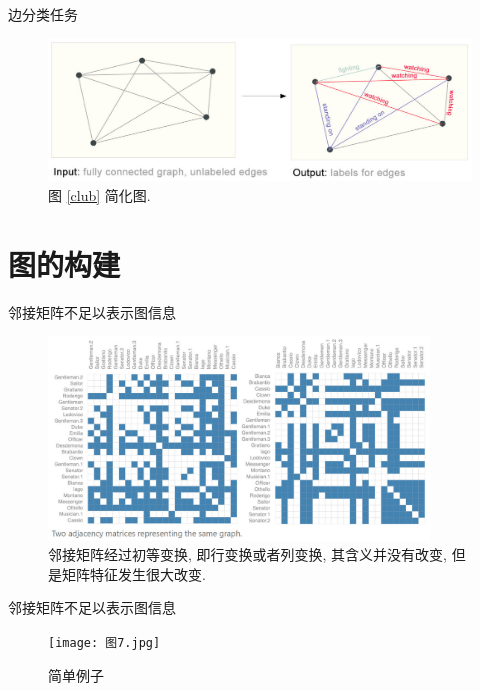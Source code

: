 \documentclass{beamer}
\begin{document}
\begin{frame}{边分类任务}
    \begin{figure}
        \includegraphics[width=\textwidth]{边分类2.jpg}
        \caption{图 \ref{club} 简化图. }
    \end{figure}
\end{frame}

\section{图的构建}

\begin{frame}{邻接矩阵不足以表示图信息}
    \begin{figure}
        \includegraphics[width=0.9\textwidth]{邻接矩阵.jpg}
        \caption{邻接矩阵经过初等变换, 即行变换或者列变换, 其含义并没有改变, 但是矩阵特征发生很大改变. }
    \end{figure}
\end{frame}

\begin{frame}{邻接矩阵不足以表示图信息}
    \begin{figure}
        \texttt{[image: 图7.jpg]}
        \caption{简单例子}
    \end{figure}
\end{frame}
\end{document}
